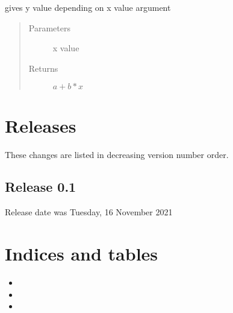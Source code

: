 \documentclass[a4paper,10pt,english]{sphinxmanual}
\begin{document}
\begin{fulllineitems}

\begin{fulllineitems}
\label{\detokenize{api/Derivate:Derivate.Line.y}}
\sphinxAtStartPar
gives y value depending on x value argument
\begin{quote}\begin{description}
\item[{Parameters}] \leavevmode
\sphinxAtStartPar
{} \textendash{} x value

\item[{Returns}] \leavevmode
\sphinxAtStartPar
\(a + b * x\)

\end{description}\end{quote}

\end{fulllineitems}


\end{fulllineitems}



\chapter{Releases}
\label{\detokenize{releases:releases}}\label{\detokenize{releases::doc}}
\sphinxAtStartPar
These changes are listed in decreasing version number order.


\section{Release 0.1}
\label{\detokenize{releases:release-0-1}}
\sphinxAtStartPar
Release date was Tuesday, 16 November 2021


\chapter{Indices and tables}
\label{\detokenize{index:indices-and-tables}}\begin{itemize}
\item {} 
\sphinxAtStartPar
{}

\item {} 
\sphinxAtStartPar
{}

\item {} 
\sphinxAtStartPar
{}

\end{itemize}
\end{document}
